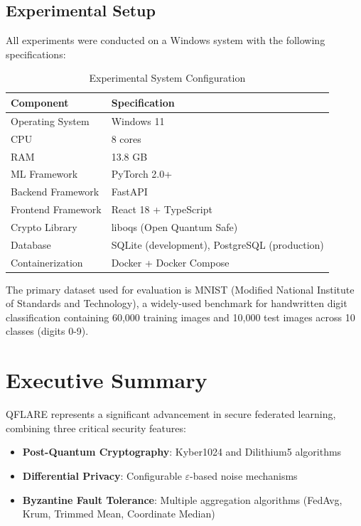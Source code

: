 \documentclass[12pt,a4paper]{article}
\begin{document}
\subsection{Experimental Setup}

All experiments were conducted on a Windows system with the following specifications:

\begin{table}[H]
\centering
\caption{Experimental System Configuration}
\label{tab:system_config}
\begin{tabular}{ll}
\toprule
\textbf{Component} & \textbf{Specification} \\
\midrule
Operating System & Windows 11 \\
CPU & 8 cores \\
RAM & 13.8 GB \\
ML Framework & PyTorch 2.0+ \\
Backend Framework & FastAPI \\
Frontend Framework & React 18 + TypeScript \\
Crypto Library & liboqs (Open Quantum Safe) \\
Database & SQLite (development), PostgreSQL (production) \\
Containerization & Docker + Docker Compose \\
\bottomrule
\end{tabular}
\end{table}

The primary dataset used for evaluation is MNIST (Modified National Institute of Standards and Technology), a widely-used benchmark for handwritten digit classification containing 60,000 training images and 10,000 test images across 10 classes (digits 0-9).

\section{Executive Summary}

QFLARE represents a significant advancement in secure federated learning, combining three critical security features:
\begin{itemize}
    \item \textbf{Post-Quantum Cryptography}: Kyber1024 and Dilithium5 algorithms
    \item \textbf{Differential Privacy}: Configurable $\varepsilon$-based noise mechanisms
    \item \textbf{Byzantine Fault Tolerance}: Multiple aggregation algorithms (FedAvg, Krum, Trimmed Mean, Coordinate Median)
\end{itemize}
\end{document}
